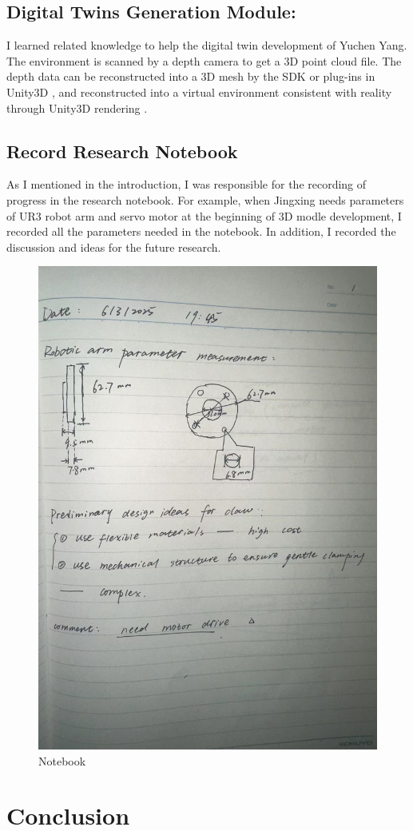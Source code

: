 \documentclass{senior-design-individual}
\begin{document}
\section{Digital Twins Generation Module:}
I learned related knowledge to help the digital twin development of Yuchen Yang. The environment is scanned by a depth camera to get a 3D point cloud file. The depth data can be reconstructed into a 3D mesh by the SDK or plug-ins in Unity3D \cite{unity_camera_reference_2024}, and reconstructed into a virtual environment consistent with reality through Unity3D rendering \cite{unity_mesh_renderer_6000}.
\section{Record Research Notebook}
As I mentioned in the introduction, I was responsible for the recording of progress in the research notebook. For example, when Jingxing needs parameters of UR3 robot arm and servo motor at the beginning of 3D modle development, I recorded all the parameters needed in the notebook. In addition, I recorded the discussion and ideas for the future research.
\begin{figure}[h]
    \centering
    \includegraphics[width=0.6\linewidth]{notebook.png}
    \caption{Notebook}
\end{figure}
\chapter{Conclusion}
\end{document}
